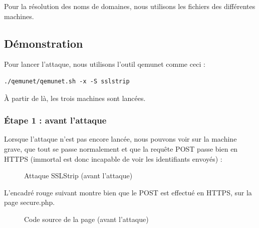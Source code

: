 Pour la résolution des noms de domaines, nous utilisons les fichiers  des différentes machines.

\subsection{Démonstration}

Pour lancer l'attaque, nous utilisons l'outil qemunet comme ceci :

\begin{verbatim}
./qemunet/qemunet.sh -x -S sslstrip
\end{verbatim}

À partir de là, les trois machines sont lancées.

\subsubsection{Étape 1 : avant l'attaque}

Lorsque l'attaque n'est pas encore lancée, nous pouvons voir sur la machine grave, que tout se passe normalement et que la requête POST passe bien en HTTPS (immortal est donc incapable de voir les identifiants envoyés) :

\begin{figure}[H]
  \caption{Attaque SSLStrip (avant l'attaque)}
\end{figure}

L'encadré rouge suivant montre bien que le POST est effectué en HTTPS, sur la page secure.php.

\begin{figure}[H]
  \caption{Code source de la page (avant l'attaque)}
\end{figure}

